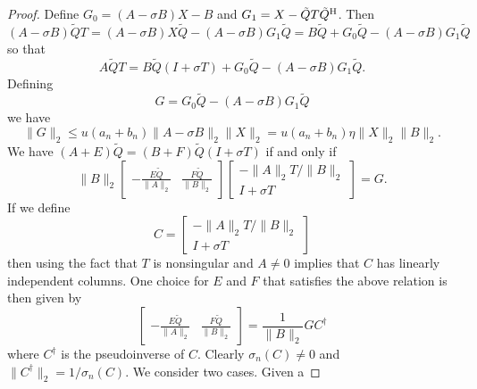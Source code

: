 \documentclass[12pt]{article}
\def\H{{\rm H}}
\begin{document}
\begin{proof}
  Define $G_0 = (A-\sigma B) X - B$ and $G_1 = X - \tilde{Q}T\tilde{Q}^\H$.  Then
  \begin{equation*}
    (A-\sigma B) \tilde{Q} T 
    = (A-\sigma B) X \tilde{Q} - (A-\sigma B) G_1 \tilde{Q}
    = B\tilde{Q} + G_0\tilde{Q} - (A-\sigma B) G_1 \tilde{Q}
  \end{equation*}
  so that
  \begin{equation*}
    A \tilde{Q} T= B \tilde{Q} (I+\sigma T) + G_0 \tilde{Q} - (A-\sigma B)G_1 \tilde{Q}.
  \end{equation*}
  Defining
  \begin{equation*}
    G = G_0 \tilde{Q} - (A-\sigma B)G_1 \tilde{Q}
  \end{equation*}
  we have
  \begin{equation*}
    \|G\|_2
    \leq u (a_n + b_n) \|A-\sigma B\|_2 \|X\|_2
    = u (a_n + b_n) \eta \|X\|_2 \|B\|_2.
  \end{equation*}
  We have $(A+E)\tilde{Q} = (B+F)\tilde{Q}(I+\sigma T)$ if and only if
  \begin{equation*}
    \|B\|_2 \begin{bmatrix}
      -\frac{E\tilde{Q}}{\|A\|_2} & \frac{F\tilde{Q}}{\|B\|_2}
    \end{bmatrix}
    \begin{bmatrix}
      -\|A\|_2 T / \|B\|_2 \\ I + \sigma T
    \end{bmatrix}
    = G.
  \end{equation*}
  If we define
  \begin{equation*}
    C
    =
    \begin{bmatrix}
      -\|A\|_2 T / \|B\|_2 \\ I + \sigma T
    \end{bmatrix}
  \end{equation*}
  then using the fact that $T$ is nonsingular and $A \neq 0$ implies
  that $C$ has linearly independent columns.  One choice for $E$ and
  $F$ that satisfies the above relation is then given by
  \begin{equation*}
    \begin{bmatrix}
      -\frac{E\tilde{Q}}{\|A\|_2} & \frac{F\tilde{Q}}{\|B\|_2}
    \end{bmatrix} = \frac{1}{\|B\|_2} G C^{\dagger}
  \end{equation*}
  where $C^{\dagger}$ is the pseudoinverse of $C$.  Clearly $\sigma_n(C)\neq 0$ and
  $\|C^\dagger\|_2 = 1/\sigma_n(C)$.  We consider two cases.  Given a

\end{proof}
\end{document}
